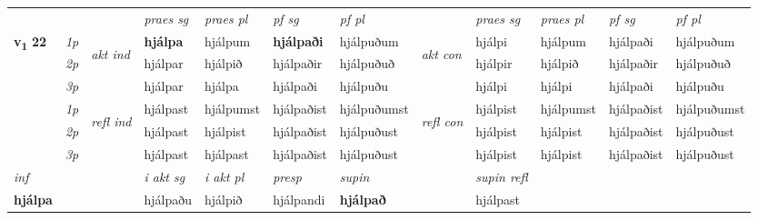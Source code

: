 \begin{longtable}[l]{X>{\footnotesize\itshape}llXXXXlXXXX}
\midrule

 & &   & \textit{praes sg}  & \textit{praes pl}    & \textit{ pf sg} & \textit{pf pl} & & \textit{praes sg}  & \textit{praes pl}    & \textit{pf sg} & \textit{pf pl }  \\ \cmidrule{4-7} \cmidrule{9-12}
 \multirow{2}{*}{{{\textbf{v{\textsubscript{1}}} \Large{\textbf{22}}}}}  & 1p & \multirow{3}{*}{\begin{turn}{90}\textit{akt ind}\end{turn}} & \textbf{hjálpa} & hjálpum & \textbf{hjálpaði} & hjálpuðum & \multirow{3}{*}{\begin{turn}{90}\textit{akt con}\end{turn}} &hjálpi & hjálpum & hjálpaði & hjálpuðum\\*
 & 2p &  &  hjálpar  & hjálpið & hjálpaðir & hjálpuðuð & & hjálpir & hjálpið & hjálpaðir & hjálpuðuð \\*
 & 3p &  & hjálpar & hjálpa & hjálpaði & hjálpuðu & & hjálpi & hjálpi& hjálpaði & hjálpuðu \\*
\cmidrule{4-7} \cmidrule{9-12}
 & 1p & \multirow{3}{*}{\begin{turn}{90}\textit{refl ind}\end{turn}}  & hjálpast & hjálpumst & hjálpaðist & hjálpuðumst & \multirow{3}{*}{\begin{turn}{90}\textit{refl con}\end{turn}}  &hjálpist & hjálpumst & hjálpaðist & hjálpuðumst \\*
 & 2p &  & hjálpast & hjálpist & hjálpaðist & hjálpuðust & &hjálpist & hjálpist & hjálpaðist & hjálpuðust \\*
 & 3p  & & hjálpast & hjálpast & hjálpaðist & hjálpuðust & & hjálpist & hjálpist& hjálpaðist & hjálpuðust \\*
\cmidrule{4-7} \cmidrule{9-12}

   {\textit{inf}} & &  & \textit{i akt sg} & \textit{i akt pl}   & \textit{presp} & \textit{supin} && \textit{supin refl}  \\*
  {\textbf{hjálpa}} & && hjálpaðu  & hjálpið   & hjálpandi &  \textbf{hjálpað} && hjálpast  \\*

\midrule


\end{longtable}
